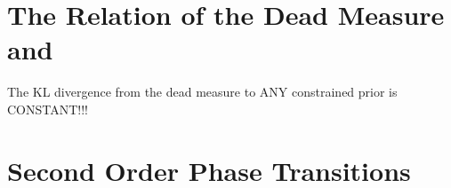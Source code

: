 \documentclass[entropy,article,submit,pdftex,moreauthors]{Definitions/mdpi}
\begin{document}
\section{The Relation of the Dead Measure and }
The KL divergence from the dead measure to ANY constrained prior
is CONSTANT!!!


\section{Second Order Phase Transitions}








\end{document}
